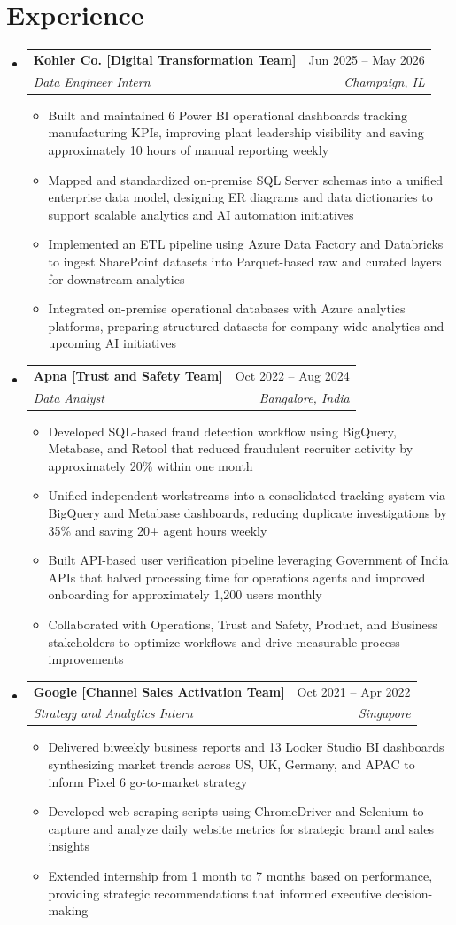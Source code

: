 \documentclass[letterpaper,11pt]{article}
\makeatletter
\newcommand{\resumeItem}[2]{
  \item{
    \textbf{#1}{: #2 \vspace{-2pt}}
  }
}
\newcommand{\resumeSubheading}[4]{
  \vspace{0pt}\item
    \begin{tabular*}{\textwidth}{l@{\extracolsep{\fill}}r}
      \textbf{#1} & #2 \\
      \textit{#3} & \textit{#4} \\ 
    \end{tabular*}\vspace{-6pt}
}
\newcommand{\resumeSubHeadingListStart}{\begin{itemize}[leftmargin=0pt,label={},itemsep=-2pt]}
\newcommand{\resumeSubHeadingListEnd}{\end{itemize}}
\newcommand{\resumeItemListStart}{\begin{itemize}[leftmargin=12pt, nosep, topsep=2pt]}
\newcommand{\resumeItemListEnd}{\end{itemize}}
\renewcommand{\resumeItem}[2]{
  \item {#2}
}
\makeatother
\begin{document}
\section{Experience}
  \resumeSubHeadingListStart
{}
\resumeSubheading
      {Kohler Co. [Digital Transformation Team]}{Jun 2025 -- May 2026}
      {Data Engineer Intern}{Champaign, IL}
      \resumeItemListStart
        \resumeItem{Power BI Dashboards}{Built and maintained 6 Power BI operational dashboards tracking manufacturing KPIs, improving plant leadership visibility and saving approximately 10 hours of manual reporting weekly}
        \resumeItem{Enterprise Data Model}{Mapped and standardized on-premise SQL Server schemas into a unified enterprise data model, designing ER diagrams and data dictionaries to support scalable analytics and AI automation initiatives}
        \resumeItem{Azure ETL Pipeline}{Implemented an ETL pipeline using Azure Data Factory and Databricks to ingest SharePoint datasets into Parquet-based raw and curated layers for downstream analytics}
        \resumeItem{Data Integration}{Integrated on-premise operational databases with Azure analytics platforms, preparing structured datasets for company-wide analytics and upcoming AI initiatives}
      \resumeItemListEnd
{}
\resumeSubheading
      {Apna [Trust and Safety Team]}{Oct 2022 -- Aug 2024}
      {Data Analyst}{Bangalore, India}
      \resumeItemListStart
        \resumeItem{Fraud Detection System}{Developed SQL-based fraud detection workflow using BigQuery, Metabase, and Retool that reduced fraudulent recruiter activity by approximately 20\% within one month}
        \resumeItem{Investigation Optimization}{Unified independent workstreams into a consolidated tracking system via BigQuery and Metabase dashboards, reducing duplicate investigations by 35\% and saving 20+ agent hours weekly}
        \resumeItem{User Verification Pipeline}{Built API-based user verification pipeline leveraging Government of India APIs that halved processing time for operations agents and improved onboarding for approximately 1,200 users monthly}
        \resumeItem{Cross-functional Partnership}{Collaborated with Operations, Trust and Safety, Product, and Business stakeholders to optimize workflows and drive measurable process improvements}
      \resumeItemListEnd
{}
\resumeSubheading
      {Google [Channel Sales Activation Team]}{Oct 2021 -- Apr 2022}
      {Strategy and Analytics Intern}{Singapore}
      \resumeItemListStart
        \resumeItem{Business Intelligence}{Delivered biweekly business reports and 13 Looker Studio BI dashboards synthesizing market trends across US, UK, Germany, and APAC to inform Pixel 6 go-to-market strategy}
        \resumeItem{Data Pipeline}{Developed web scraping scripts using ChromeDriver and Selenium to capture and analyze daily website metrics for strategic brand and sales insights}
        \resumeItem{Market Intelligence}{Extended internship from 1 month to 7 months based on performance, providing strategic recommendations that informed executive decision-making}
      \resumeItemListEnd
  \resumeSubHeadingListEnd
\end{document}
